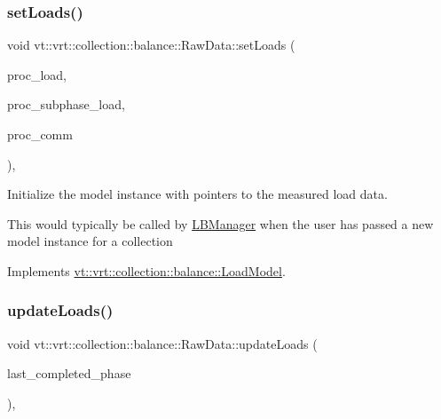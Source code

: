 \subsubsection{\texorpdfstring{set\+Loads()}{setLoads()}}
{\footnotesize\ttfamily void vt\+::vrt\+::collection\+::balance\+::\+Raw\+Data\+::set\+Loads (\begin{DoxyParamCaption}\item[{std\+::unordered\+\_\+map$<$ \hyperlink{namespacevt_a46ce6733d5cdbd735d561b7b4029f6d7}{Phase\+Type}, \hyperlink{namespacevt_1_1vrt_1_1collection_1_1balance_a45306ee4bf38fe3fb586d1ee2fa3d147}{Load\+Map\+Type} $>$ const $\ast$}]{proc\+\_\+load,  }\item[{std\+::unordered\+\_\+map$<$ \hyperlink{namespacevt_a46ce6733d5cdbd735d561b7b4029f6d7}{Phase\+Type}, \hyperlink{namespacevt_1_1vrt_1_1collection_1_1balance_a3d91523158c1025b7b665240072f3b7e}{Subphase\+Load\+Map\+Type} $>$ const $\ast$}]{proc\+\_\+subphase\+\_\+load,  }\item[{std\+::unordered\+\_\+map$<$ \hyperlink{namespacevt_a46ce6733d5cdbd735d561b7b4029f6d7}{Phase\+Type}, \hyperlink{namespacevt_1_1vrt_1_1collection_1_1balance_a10860c956804d644db54a16012352728}{Comm\+Map\+Type} $>$ const $\ast$}]{proc\+\_\+comm }\end{DoxyParamCaption})\hspace{0.3cm}{\ttfamily [override]}, {\ttfamily [virtual]}}



Initialize the model instance with pointers to the measured load data. 

This would typically be called by \hyperlink{structvt_1_1vrt_1_1collection_1_1balance_1_1_l_b_manager}{L\+B\+Manager} when the user has passed a new model instance for a collection 

Implements \hyperlink{classvt_1_1vrt_1_1collection_1_1balance_1_1_load_model_a621d040453688c70c168176b40cf90df}{vt\+::vrt\+::collection\+::balance\+::\+Load\+Model}.

\mbox{\label{structvt_1_1vrt_1_1collection_1_1balance_1_1_raw_data_a4aaae24a53ead0248b873911ce560a34}} 
\subsubsection{\texorpdfstring{update\+Loads()}{updateLoads()}}
{\footnotesize\ttfamily void vt\+::vrt\+::collection\+::balance\+::\+Raw\+Data\+::update\+Loads (\begin{DoxyParamCaption}\item[{\hyperlink{namespacevt_a46ce6733d5cdbd735d561b7b4029f6d7}{Phase\+Type}}]{last\+\_\+completed\+\_\+phase }\end{DoxyParamCaption})\hspace{0.3cm}{\ttfamily [override]}, {\ttfamily [virtual]}}



